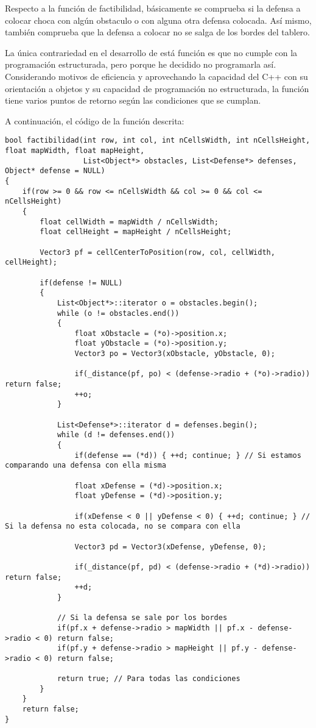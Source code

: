 \lstset{language=C++, texcl=true}

Respecto a la función de factibilidad, básicamente se comprueba
si la defensa a colocar choca con algún obstaculo o con alguna
otra defensa colocada. Así mismo, también comprueba que la defensa
a colocar no se salga de los bordes del tablero.

La única contrariedad en el desarrollo de está función es que
no cumple con la programación estructurada, pero porque he decidido
no programarla así. Considerando motivos de eficiencia y aprovechando
la capacidad del C++ con su orientación a objetos y su capacidad
de programación no estructurada, la función tiene varios puntos de
retorno según las condiciones que se cumplan.

A continuación, el código de la función descrita:

\begin{lstlisting}[frame=single]
bool factibilidad(int row, int col, int nCellsWidth, int nCellsHeight, float mapWidth, float mapHeight,
                  List<Object*> obstacles, List<Defense*> defenses, Object* defense = NULL)
{
    if(row >= 0 && row <= nCellsWidth && col >= 0 && col <= nCellsHeight)
    {
        float cellWidth = mapWidth / nCellsWidth;
        float cellHeight = mapHeight / nCellsHeight;

        Vector3 pf = cellCenterToPosition(row, col, cellWidth, cellHeight);

        if(defense != NULL)
        {
            List<Object*>::iterator o = obstacles.begin();
            while (o != obstacles.end())
            {
                float xObstacle = (*o)->position.x;
                float yObstacle = (*o)->position.y;
                Vector3 po = Vector3(xObstacle, yObstacle, 0);

                if(_distance(pf, po) < (defense->radio + (*o)->radio)) return false;
                ++o;
            }

            List<Defense*>::iterator d = defenses.begin();
            while (d != defenses.end())
            {
                if(defense == (*d)) { ++d; continue; } // Si estamos comparando una defensa con ella misma

                float xDefense = (*d)->position.x;
                float yDefense = (*d)->position.y;

                if(xDefense < 0 || yDefense < 0) { ++d; continue; } // Si la defensa no esta colocada, no se compara con ella

                Vector3 pd = Vector3(xDefense, yDefense, 0);

                if(_distance(pf, pd) < (defense->radio + (*d)->radio)) return false;
                ++d;
            }

            // Si la defensa se sale por los bordes
            if(pf.x + defense->radio > mapWidth || pf.x - defense->radio < 0) return false;
            if(pf.y + defense->radio > mapHeight || pf.y - defense->radio < 0) return false;

            return true; // Para todas las condiciones
        }
    }
    return false;
}
\end{lstlisting}
